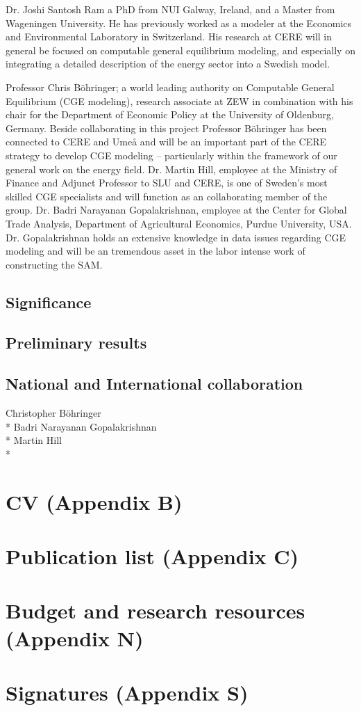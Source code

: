 \documentclass[10pt,a4paper]{article}
\begin{document}
Dr. Joshi Santosh Ram a PhD from NUI Galway, Ireland, and a Master from Wageningen University. He has previously worked as a modeler at the Economics and Environmental Laboratory in Switzerland. His research at CERE will in general be focused on computable general equilibrium modeling, and especially on integrating a detailed description of the energy sector into a Swedish model.

Professor Chris Böhringer; a world leading authority on Computable General Equilibrium (CGE modeling), research associate at ZEW in combination with his chair for the Department of Economic Policy at the University of Oldenburg, Germany. Beside collaborating in this project Professor Böhringer has been connected to CERE and Umeå and will be an important part of the CERE strategy to develop CGE modeling – particularly within the framework of our general work on the energy field.
Dr. Martin Hill, employee at the Ministry of Finance and Adjunct Professor to SLU and CERE, is one of Sweden's most skilled CGE specialists and will function as an collaborating member of the group.
Dr. Badri Narayanan Gopalakrishnan, employee at the Center for Global Trade Analysis, Department of Agricultural Economics, Purdue University, USA. Dr. Gopalakrishnan holds an extensive knowledge in data issues regarding CGE modeling and will be an tremendous asset in the labor intense work of constructing the SAM.
\subsection{Significance}

\subsection{Preliminary results}

\subsection{National and International collaboration}
Christopher Böhringer\\*
Badri Narayanan Gopalakrishnan\\*
Martin Hill\\*

\section{CV (Appendix B)}
\section{Publication list (Appendix C)}
\section{Budget and research resources (Appendix N)}
\section{Signatures (Appendix S)}



\pagebreak
{}


\end{document}
